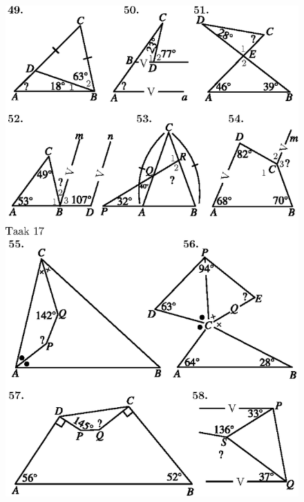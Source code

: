 \begin{figure}[H]
\centering
\includegraphics{figure/fig_04.eps}
\caption{}\label{chap6-fig4}
\end{figure}

\vfill\eject

~\phantom{a}

